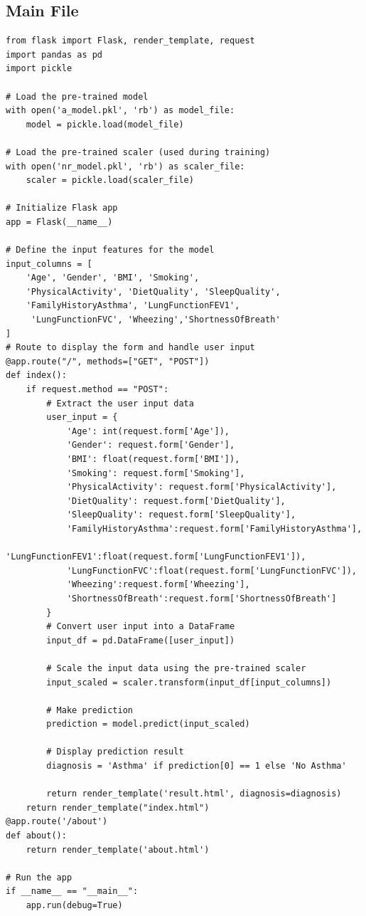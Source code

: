 \subsection{Main File}
\begin{verbatim}
from flask import Flask, render_template, request
import pandas as pd
import pickle

# Load the pre-trained model
with open('a_model.pkl', 'rb') as model_file:
    model = pickle.load(model_file)

# Load the pre-trained scaler (used during training)
with open('nr_model.pkl', 'rb') as scaler_file:
    scaler = pickle.load(scaler_file)

# Initialize Flask app
app = Flask(__name__)

# Define the input features for the model
input_columns = [
    'Age', 'Gender', 'BMI', 'Smoking', 
    'PhysicalActivity', 'DietQuality', 'SleepQuality',
    'FamilyHistoryAsthma', 'LungFunctionFEV1',
     'LungFunctionFVC', 'Wheezing','ShortnessOfBreath'
]
# Route to display the form and handle user input
@app.route("/", methods=["GET", "POST"])
def index():    
    if request.method == "POST":
        # Extract the user input data
        user_input = {
            'Age': int(request.form['Age']),
            'Gender': request.form['Gender'],
            'BMI': float(request.form['BMI']),
            'Smoking': request.form['Smoking'],
            'PhysicalActivity': request.form['PhysicalActivity'],
            'DietQuality': request.form['DietQuality'],
            'SleepQuality': request.form['SleepQuality'],
            'FamilyHistoryAsthma':request.form['FamilyHistoryAsthma'],
            'LungFunctionFEV1':float(request.form['LungFunctionFEV1']),
            'LungFunctionFVC':float(request.form['LungFunctionFVC']),
            'Wheezing':request.form['Wheezing'],
            'ShortnessOfBreath':request.form['ShortnessOfBreath']
        }
        # Convert user input into a DataFrame
        input_df = pd.DataFrame([user_input])

        # Scale the input data using the pre-trained scaler
        input_scaled = scaler.transform(input_df[input_columns])

        # Make prediction
        prediction = model.predict(input_scaled)

        # Display prediction result
        diagnosis = 'Asthma' if prediction[0] == 1 else 'No Asthma'

        return render_template('result.html', diagnosis=diagnosis)
    return render_template("index.html")
@app.route('/about')
def about():
    return render_template('about.html')    

# Run the app
if __name__ == "__main__":
    app.run(debug=True)

\end{verbatim}

